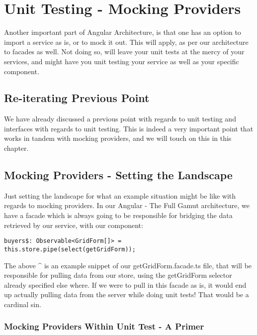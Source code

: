 \maketitle{}
\section{ Unit Testing - Mocking Providers }
Another important part of Angular Architecture, is that one has an option to
import a service as is, or to mock it out. This will apply, as per our
architecture to facades as well. Not doing so, will leave your unit tests at
the mercy of your services, and might have you unit testing your service as
well as your specific component.

\subsection{ Re-iterating Previous Point }
We have already discussed a previous point with regards to unit testing and
interfaces with regards to unit testing. This is indeed a very important point
that works in tandem with mocking providers, and we will touch on this in this
chapter.

\subsection{ Mocking Providers - Setting the Landscape }
Just setting the landscape for what an example situation might be like with
regards to mocking providers. In our Angular - The Full Gamut architecture, we
have a facade which is always going to be responsible for bridging the data
retrieved by our service, with our component:
\begin{lstlisting}
buyers$: Observable<GridForm[]> = this.store.pipe(select(getGridForm));
\end{lstlisting}

The above ^ is an example snippet of our getGridForm.facade.ts file, that will
be responsible for pulling data from our store, using the getGridForm selector
already specified else where. If we were to pull in this facade as is, it would
end up actually pulling data from the server while doing unit tests! That would
be a cardinal sin.

\subsubsection{ Mocking Providers Within Unit Test - A Primer }
